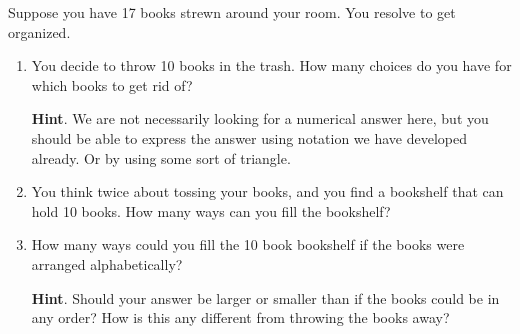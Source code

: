 \documentclass{book}
\begin{document}
\setcounter{cpjt}{91}
\addtocounter{cpjt}{-1}
\begin{activity}\label{activity-84}
\hypertarget{p-658}{}%
Suppose you have 17 books strewn around your room.  You resolve to get organized.%
\begin{enumerate}[font=\bfseries,label=(\alph*),ref=\alph*]
\item\label{task-133} \hypertarget{p-659}{}%
You decide to throw 10 books in the trash.  How many choices do you have for which books to get rid of?%
\par\smallskip%
\noindent\textbf{Hint}.\hypertarget{hint-45}{}\quad%
\hypertarget{p-660}{}%
We are not necessarily looking for a numerical answer here, but you should be able to express the answer using notation we have developed already.  Or by using some sort of triangle.%
\item\label{task-134} \hypertarget{p-661}{}%
You think twice about tossing your books, and you find a bookshelf that can hold 10 books.  How many ways can you fill the bookshelf?%
\item\label{task-135} \hypertarget{p-662}{}%
How many ways could you fill the 10 book bookshelf if the books were arranged alphabetically?%
\par\smallskip%
\noindent\textbf{Hint}.\hypertarget{hint-46}{}\quad%
\hypertarget{p-663}{}%
Should your answer be larger or smaller than if the books could be in any order?  How is this any different from throwing the books away?%
\end{enumerate}
\end{activity}

\clearpage
\end{document}
